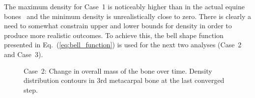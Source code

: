\documentclass[review]{elsarticle}
\numberwithin{equation}{section}
\begin{document}
The maximum density for Case~1 is noticeably higher than in the actual equine bones~\citep{yamada2015experimental} and the minimum density is unrealistically close to zero. 
There is clearly a need to somewhat constrain upper and lower bounds for density in order to produce more realistic outcomes.
To achieve this, the bell shape function presented in Eq.~(\ref{eq:bell_function}) is used for the next two analyses (Case~2 and Case~3). 

\begin{figure}[h!]
\centering
		\caption{Case~2: Change in overall mass of the bone over time. Density distribution contours in 3rd metacarpal bone at the last converged step.}
		\label{fig:density_bell1}
\end{figure}
\end{document}

